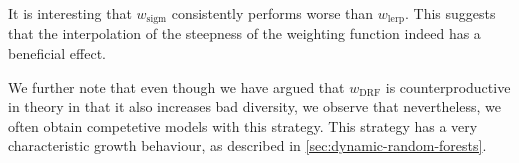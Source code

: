 \documentclass[../main.tex]{subfiles}
\begin{document}
 It is interesting that $w_\text{sigm}$ consistently performs worse than $w_\text{lerp}$. This suggests that the interpolation of the steepness of the weighting function indeed has a beneficial effect.

 We further note that even though we have argued that $w_\text{DRF}$ is counterproductive in theory in that it also increases bad diversity, we observe that nevertheless, we often obtain competetive models with this strategy. This strategy has a very characteristic growth behaviour, as described in \cref{sec:dynamic-random-forests}.












\end{document}
